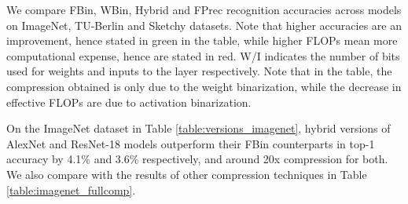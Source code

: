 \documentclass[10pt,twocolumn,letterpaper]{article}
\begin{document}
We compare FBin, WBin, Hybrid and FPrec recognition accuracies across models on ImageNet, TU-Berlin and Sketchy datasets. Note that higher accuracies are an improvement, hence stated in green in the table, while higher FLOPs mean more computational expense, hence are stated in red. W/I indicates the number of bits used for weights and inputs to the layer respectively. Note that in the table, the compression obtained is only due to the weight binarization, while the decrease in effective FLOPs are due to activation binarization.

On the ImageNet dataset in Table \ref{table:versions_imagenet}, hybrid versions of AlexNet and ResNet-18 models outperform their FBin counterparts in top-1 accuracy by 4.1\% and 3.6\% respectively, and around 20x compression for both. We also compare with the results of other compression techniques in Table \ref{table:imagenet_fullcomp}.
\begin{table}[t]
\caption{Our hybrid models compared to FBin, WBin and NoBin models on Imagenet in terms of accuracy, memory and computations expense.}
\label{table:versions_imagenet}
\vspace{-0.4cm}
\end{table}
\end{document}
